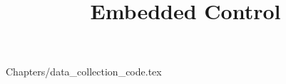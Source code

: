 \documentclass[a4paper, 10pt]{article}
\begin{document}
\title{Embedded Control}



\newpage
\tableofcontents






 {Chapters/data_collection_code.tex}






\end{document}
